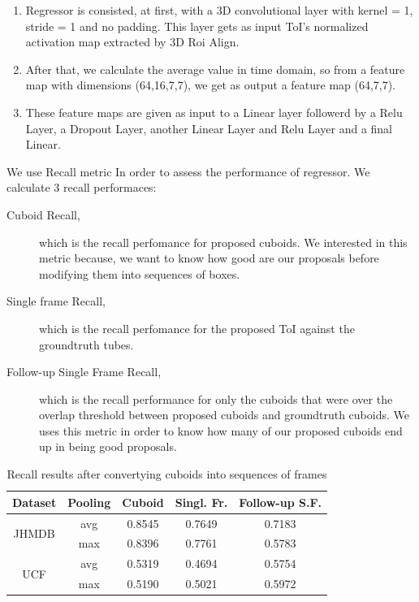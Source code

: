 \begin{enumerate}
\item Regressor is consisted, at first, with a 3D convolutional layer with kernel = 1, stride = 1 and no padding. This layer gets as input ToI's normalized activation map extracted by 3D Roi Align.
\item After that, we calculate the average value in time domain, so from a feature map with dimensions (64,16,7,7), we get as output a feature map (64,7,7).
\item These feature maps are given as input to a Linear layer followerd by a Relu Layer, a Dropout Layer, another Linear Layer and Relu Layer and a final Linear.
\end{enumerate}

We use Recall metric In order to assess the performance of regressor. We calculate 3 recall performaces:
\begin{description}
\item [Cuboid Recall,] which is the recall perfomance for proposed cuboids. We interested in this metric because, we
  want to know how good are our proposals before modifying them into sequences of boxes.

\item [Single frame Recall,] which is the recall perfomance for the proposed ToI against the groundtruth tubes.
\item[Follow-up Single Frame Recall,] which is the recall performance for only the cuboids that were over the overlap threshold between
  proposed cuboids and groundtruth cuboids. We uses this metric in order to know how many of our proposed cuboids end up in being good proposals.
\end{description}

\begin{table}[h]
  \centering
  \begin{tabular} {||c | c || c | c | c ||}
    \hline
    \textbf{Dataset} & \textbf{Pooling} & \textbf{Cuboid} & \textbf{Singl. Fr. } &  \textbf{Follow-up S.F.}\\
    \hline                
    \multirow{2}{*}{JHMDB} & avg & 0.8545 & 0.7649 & 0.7183 \\
    \cline{2-5}
    {} & max & 0.8396 & 0.7761 & 0.5783 \\
    \cline{1-5}
    \multirow{2}{*}{UCF} & avg & 0.5319 & 0.4694 & 0.5754 \\
    \cline{2-5}
    {} & max & 0.5190 & 0.5021 & 0.5972 \\
    \cline{1-5}
                                   
  \end{tabular}
  \caption{Recall results after convertying cuboids into sequences of frames}
  \label{table:reg_1_1}
\end{table}

